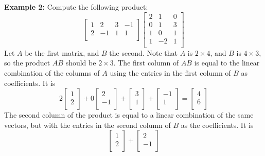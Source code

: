 \documentclass{article}
\begin{document}
\begin{examples}
  \textbf{Example 2:}
  Compute the following product:
  \[
    \begin{bmatrix}
      1 & 2 & 3 & -1\\
      2 & -1 & 1 & 1\\
    \end{bmatrix}
    \begin{bmatrix}
      2 & 1 & 0\\
      0 & 1 & 3\\
      1 & 0 & 1\\
      1 & -2 & 1\\
    \end{bmatrix}
  \]
  Let $A$ be the first matrix, and $B$ the second. Note that $A$ is $2 \times 4$, and $B$ is $4 \times 3$, so the product $AB$ should be $2 \times 3$.
  The first column of $AB$ is equal to the linear combination of the columns of $A$ using the entries in the first column of $B$ as coefficients. It is
  \[2
    \begin{bmatrix}
      1\\
      2\\
    \end{bmatrix}
    + 0
    \begin{bmatrix}
      2\\
      -1\\
    \end{bmatrix}
    +
    \begin{bmatrix}
      3\\
      1\\
    \end{bmatrix}
    +
    \begin{bmatrix}
      -1\\
      1\\
    \end{bmatrix}
    =
    \begin{bmatrix}
      4\\
      6\\
    \end{bmatrix}
  \]
  The second column of the product is equal to a linear combination of the same vectors, but with the entries in the second column of $B$ as the coefficients. It is
  \[
    \begin{bmatrix}
      1\\
      2\\
    \end{bmatrix} +
    \begin{bmatrix}
      2\\
      -1\\

\end{bmatrix}\]
\end{examples}
\end{document}
